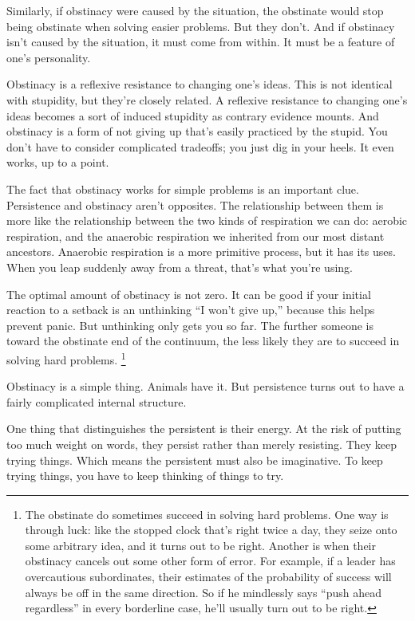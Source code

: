 Similarly, if obstinacy were caused by the situation, the obstinate
would stop being obstinate when solving easier problems. But they don't.
And if obstinacy isn't caused by the situation, it must come from
within. It must be a feature of one's personality.

Obstinacy is a reflexive resistance to changing one's ideas. This is not
identical with stupidity, but they're closely related. A reflexive
resistance to changing one's ideas becomes a sort of induced stupidity
as contrary evidence mounts. And obstinacy is a form of not giving up
that's easily practiced by the stupid. You don't have to consider
complicated tradeoffs; you just dig in your heels. It even works, up to
a point.

The fact that obstinacy works for simple problems is an important clue.
Persistence and obstinacy aren't opposites. The relationship between
them is more like the relationship between the two kinds of respiration
we can do: aerobic respiration, and the anaerobic respiration we
inherited from our most distant ancestors. Anaerobic respiration is a
more primitive process, but it has its uses. When you leap suddenly away
from a threat, that's what you're using.

The optimal amount of obstinacy is not zero. It can be good if your
initial reaction to a setback is an unthinking ``I won't give up,''
because this helps prevent panic. But unthinking only gets you so far.
The further someone is toward the obstinate end of the continuum, the
less likely they are to succeed in solving hard problems.
\footnote{The obstinate do sometimes succeed in solving hard problems. One
way is through luck: like the stopped clock that's right twice a day,
they seize onto some arbitrary idea, and it turns out to be right.
Another is when their obstinacy cancels out some other form of error.
For example, if a leader has overcautious subordinates, their estimates
of the probability of success will always be off in the same direction.
So if he mindlessly says ``push ahead regardless'' in every borderline
case, he'll usually turn out to be right.}

Obstinacy is a simple thing. Animals have it. But persistence turns out
to have a fairly complicated internal structure.

One thing that distinguishes the persistent is their energy. At the risk
of putting too much weight on words, they persist rather than merely
resisting. They keep trying things. Which means the persistent must also
be imaginative. To keep trying things, you have to keep thinking of
things to try.

